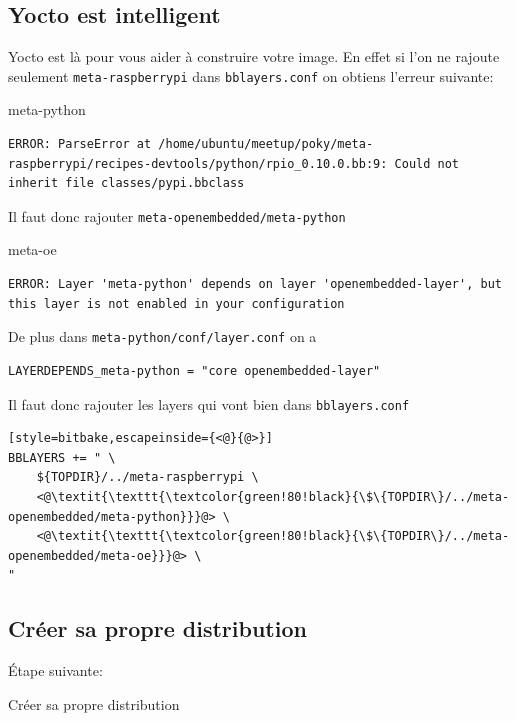 \documentclass[compress]{smilebeamer}
\begin{document}
\subsection{Yocto est intelligent}
\begin{frame}[fragile]
Yocto est là pour vous aider à construire votre image.\newline
En effet si l'on ne rajoute seulement \texttt{meta-raspberrypi} dans \texttt{bblayers.conf} on obtiens l'erreur suivante:

\begin{block}{meta-python}
\begin{lstlisting}[basicstyle=\footnotesize\ttfamily\color{red!80!black!60}]
ERROR: ParseError at /home/ubuntu/meetup/poky/meta-raspberrypi/recipes-devtools/python/rpio_0.10.0.bb:9: Could not inherit file classes/pypi.bbclass
\end{lstlisting}
Il faut donc rajouter \texttt{meta-openembedded/meta-python}
\end{block}

\begin{block}{meta-oe}
\begin{lstlisting}[basicstyle=\footnotesize\ttfamily\color{red!80!black!60}]
ERROR: Layer 'meta-python' depends on layer 'openembedded-layer', but this layer is not enabled in your configuration
\end{lstlisting}
De plus dans \texttt{meta-python/conf/layer.conf} on a
\begin{lstlisting}[style=bitbake]
LAYERDEPENDS_meta-python = "core openembedded-layer"
\end{lstlisting}
\end{block}
\end{frame}

\begin{frame}[fragile]
Il faut donc rajouter les layers qui vont bien dans \texttt{bblayers.conf}
\begin{lstlisting}[style=bitbake,escapeinside={<@}{@>}]
BBLAYERS += " \
    ${TOPDIR}/../meta-raspberrypi \
    <@\textit{\texttt{\textcolor{green!80!black}{\$\{TOPDIR\}/../meta-openembedded/meta-python}}}@> \
    <@\textit{\texttt{\textcolor{green!80!black}{\$\{TOPDIR\}/../meta-openembedded/meta-oe}}}@> \
"
\end{lstlisting}
\end{frame}


\subsection{Créer sa propre distribution}
\begin{frame}
\begin{center}
\textcolor{smileOrange}{\huge{Étape suivante:}}
\end{center}
\begin{center}
\textcolor{smileOrange}{\huge{Créer sa propre distribution}}
\end{center}
\end{frame}
\end{document}
